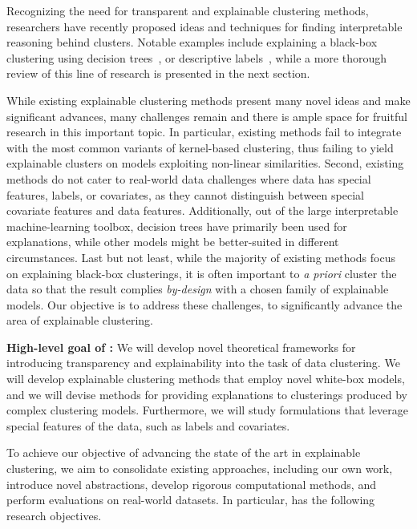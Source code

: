 \documentclass[a4paper,11pt]{article}
\begin{document}
Recognizing the need for transparent and explainable clustering methods, 
researchers have recently proposed ideas and techniques for finding 
interpretable reasoning behind clusters.
Notable examples include 
explaining a black-box clustering using decision trees~\cite{gupta2023price,moshkovitz2020explainable},
or descriptive labels~\cite{davidson2018cluster,sambaturu2020efficient}, 
while a more thorough review of this line of research is presented in the next section.

While existing explainable clustering methods present many novel ideas and make significant advances, 
many challenges remain and there is ample space for fruitful research in this important topic. 
In particular, existing methods fail to integrate with the most common variants of kernel-based clustering, 
thus failing to yield explainable clusters on models exploiting non-linear similarities.
Second, existing methods do not cater to real-world data challenges where data has special features, 
labels, or covariates, as they cannot distinguish between special covariate features and data features.
Additionally, out of the large interpretable machine-learning toolbox,
decision trees have primarily been used for explanations, 
while other models might be better-suited in different circumstances. 
Last but not least, while the majority of existing methods focus on explaining black-box clusterings, 
it is often important to \emph{a priori} cluster the data so that the result complies 
\emph{by-design} with a chosen family of explainable models.
Our objective is to address these challenges, to significantly advance the area of explainable clustering.

\medskip
\noindent
\hspace{-3mm}\colorbox{verylightmagenta}{
\begin{minipage}{\textwidth}
{\bf High-level goal of \acronym:} 
We will develop novel theoretical frameworks for 
introducing transparency and explainability into the task of data clustering. 
We will develop explainable clustering methods that employ novel white-box models, 
and we will devise methods for providing explanations to clusterings produced by complex clustering models.
Furthermore, we will study formulations that leverage special features of the data,
such as labels and covariates.
\end{minipage}}

To achieve our objective of advancing the state of the art in explainable clustering,
we aim to consolidate existing approaches, including our own work,  
introduce novel abstractions, 
develop rigorous computational methods, and 
perform evaluations on real-world datasets.
In particular, {\acronym} has the following research objectives. 
\end{document}
